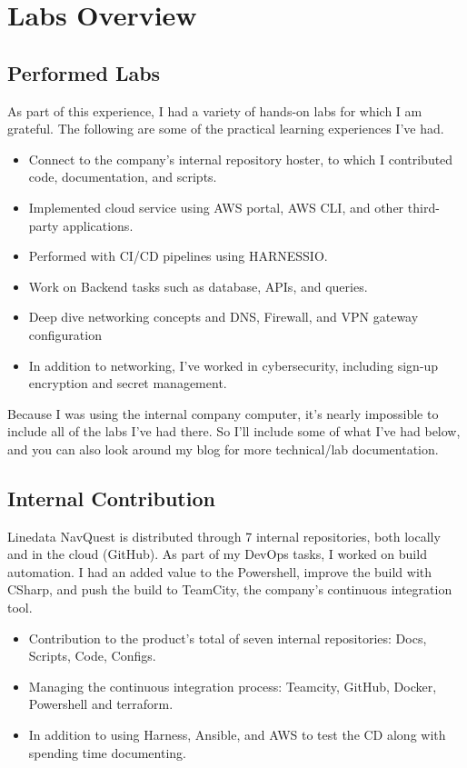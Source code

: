 \chapter{Labs Overview}


\section{Performed Labs}
  As part of this experience, I had a variety of hands-on labs for which I am grateful. The following are some of the practical learning experiences I've had.
\begin{itemize}
  \item Connect to the company's internal repository hoster, to which I contributed code, documentation, and scripts.
  \item Implemented cloud service using AWS portal, AWS CLI, and other third-party applications.
  \item Performed  with CI/CD pipelines using HARNESSIO.
  \item Work on Backend tasks such as database, APIs, and queries.
  \item Deep dive networking concepts and DNS, Firewall, and VPN gateway configuration
  \item In addition to networking, I've worked in cybersecurity, including sign-up encryption and secret management.
   
  

\end{itemize}
Because I was using the internal company computer, it's nearly impossible to include all of the labs I've had there. So I'll include some of what I've had below, and you can also look around my blog for more technical/lab documentation.
\section{Internal Contribution}

Linedata NavQuest is distributed through 7 internal repositories, both locally and in the cloud (GitHub). As part of my DevOps tasks, I worked on build automation.\newline
I had an added value to the Powershell, improve the build with CSharp, and push the build to TeamCity, the company's continuous integration tool.\newline


\begin{itemize}
  \item Contribution to the product's total of seven internal repositories: Docs, Scripts, Code, Configs.
  \item Managing the continuous integration process: Teamcity, GitHub, Docker, Powershell and terraform.
  \item In addition to using Harness, Ansible, and AWS to test the CD along with spending time documenting.

\end{itemize}


